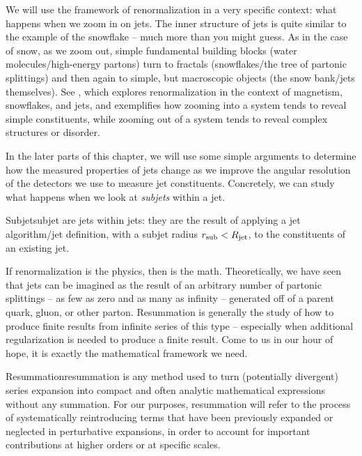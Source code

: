 We will use the framework of renormalization in a very specific context:
%
what happens when we zoom in on jets.
%
The inner structure of jets is quite similar to the example of the snowflake -- much more than you might guess.
%
As in the case of snow, as we zoom out, simple fundamental building blocks (water molecules/high-energy partons) turn to fractals (snowflakes/the tree of partonic splittings) and then again to simple, but macroscopic objects (the snow bank/jets themselves).
%
See , which explores renormalization in the context of magnetism, snowflakes, and jets, and exemplifies how zooming into a system tends to reveal simple constituents, while zooming out of a system tends to reveal complex structures or disorder.


In the later parts of this chapter, we will use some simple arguments to determine how the measured properties of jets change as we improve the angular resolution of the detectors we use to measure jet constituents.
%
Concretely, we can study what happens when we look at \textit{subjets} within a jet.
%
\begin{definitionbox}{Subjet}{subjet}
     are jets within jets:
    they are the result of applying a jet algorithm/jet definition, with a subjet radius \(r_\text{sub} < R_\text{jet}\), to the constituents of an existing jet.
\end{definitionbox}





If \gls{renormalization} is the physics, then  is the math.
%
Theoretically, we have seen that jets can be imagined as the result of an arbitrary number of partonic splittings -- as few as zero and as many as infinity -- generated off of a parent quark, gluon, or other parton.
%
Resummation is generally the study of how to produce finite results from infinite series of this type -- especially when additional regularization is needed to produce a finite result.
%
Come to us in our hour of hope, it is exactly the mathematical framework we need.

\begin{definitionbox}{Resummation}{resummation}
     is any method used to turn (potentially divergent) series expansion into compact and often analytic mathematical expressions without any summation.
    For our purposes, resummation will refer to the process of systematically reintroducing terms that have been previously expanded or neglected in perturbative expansions, in order to account for important contributions at higher orders or at specific scales.
\end{definitionbox}


